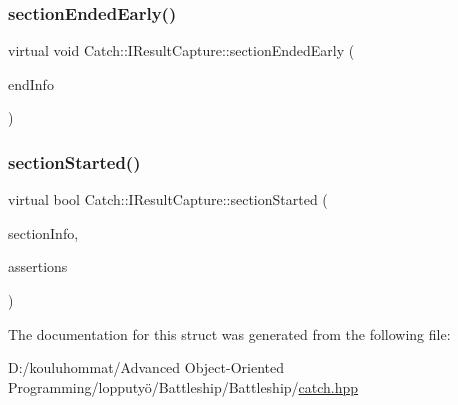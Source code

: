 \mbox{\label{struct_catch_1_1_i_result_capture_afcc71eef8ca821ae132cced4a2be6988}} 
\subsubsection{\texorpdfstring{section\+Ended\+Early()}{sectionEndedEarly()}}
{\footnotesize\ttfamily virtual void Catch\+::\+I\+Result\+Capture\+::section\+Ended\+Early (\begin{DoxyParamCaption}\item[{\mbox{\hyperlink{struct_catch_1_1_section_end_info}{Section\+End\+Info}} const \&}]{end\+Info }\end{DoxyParamCaption})\hspace{0.3cm}{\ttfamily [pure virtual]}}

\mbox{\label{struct_catch_1_1_i_result_capture_a5b76ed52badcb64cf374202e12b81a03}} 
\subsubsection{\texorpdfstring{section\+Started()}{sectionStarted()}}
{\footnotesize\ttfamily virtual bool Catch\+::\+I\+Result\+Capture\+::section\+Started (\begin{DoxyParamCaption}\item[{\mbox{\hyperlink{struct_catch_1_1_section_info}{Section\+Info}} const \&}]{section\+Info,  }\item[{\mbox{\hyperlink{struct_catch_1_1_counts}{Counts}} \&}]{assertions }\end{DoxyParamCaption})\hspace{0.3cm}{\ttfamily [pure virtual]}}



The documentation for this struct was generated from the following file\+:\begin{DoxyCompactItemize}
\item 
D\+:/kouluhommat/\+Advanced Object-\/\+Oriented Programming/lopputyö/\+Battleship/\+Battleship/\mbox{\hyperlink{catch_8hpp}{catch.\+hpp}}\end{DoxyCompactItemize}
